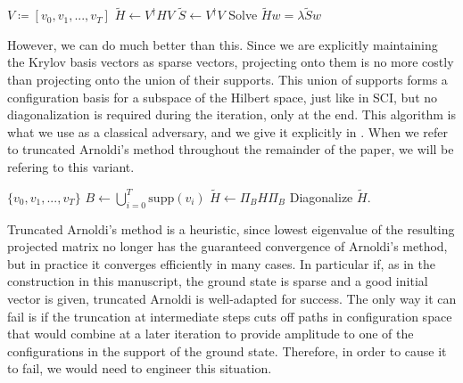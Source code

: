 \documentclass[
  reprint,            %
  amsmath,amssymb,
  aps,
  superscriptaddress, %
  longbibliography
]{revtex4-2}
\theoremstyle{definition}
\begin{document}
\begin{itemize}
\begin{algorithm}[H]
\caption{Truncated Arnoldi projection and diagonalization (not configuration basis)}\label{alg:tr_arn_pd}
\begin{algorithmic}[1]
    \Require $V\coloneqq[v_0,v_1,...,v_T]$ 
    \State $\tilde{H}\gets V^\dagger H V$ 
    \State $\tilde{S}\gets V^\dagger V$ 
    \State Solve $\tilde{H}w=\lambda\tilde{S}w$ 
\end{algorithmic}
\end{algorithm}

However, we can do much better than this.
Since we are explicitly maintaining the Krylov basis vectors as sparse vectors, projecting onto them is no more costly than projecting onto the union of their supports.
This union of supports forms a configuration basis for a subspace of the Hilbert space, just like in SCI, but no diagonalization is required during the iteration, only at the end.
This algorithm is what we use as a classical adversary, and we give it explicitly in .
When we refer to truncated Arnoldi's method throughout the remainder of the paper, we will be refering to this variant.

\begin{algorithm}[H]
\caption{Truncated Arnoldi projection and diagonalization (configuration basis)}\label{alg:tr_arn_pd_bts}
\begin{algorithmic}[1]
    \Require $\{v_0,v_1,...,v_T\}$ 
    \State $B\gets\bigcup_{i=0}^T\mathrm{supp}(v_i)$ 
    \State $\tilde{H}\gets\Pi_BH\Pi_B$ 
    \State Diagonalize $\tilde{H}$.
\end{algorithmic}
\end{algorithm}

Truncated Arnoldi's method is a heuristic, since lowest eigenvalue of the resulting projected matrix no longer has the guaranteed convergence of Arnoldi's method, but in practice it converges efficiently in many cases.
In particular if, as in the construction in this manuscript, the ground state is sparse and a good initial vector is given, truncated Arnoldi is well-adapted for success.
The only way it can fail is if the truncation at intermediate steps cuts off paths in configuration space that would combine at a later iteration to provide amplitude to one of the configurations in the support of the ground state.
Therefore, in order to cause it to fail, we would need to engineer this situation.

\end{itemize}
\end{document}
